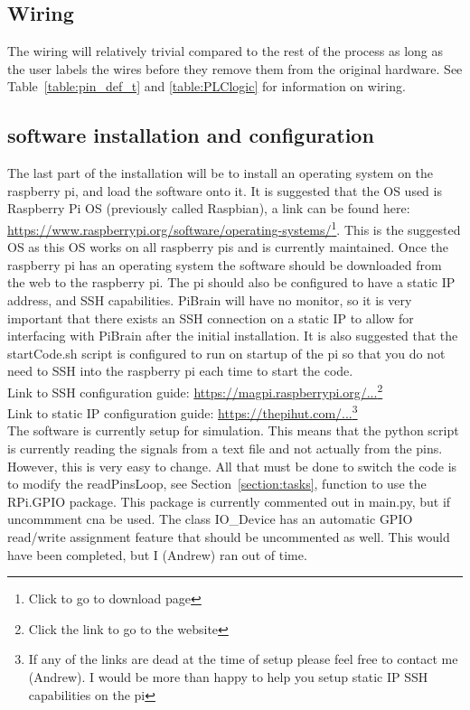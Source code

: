 \documentclass[titlepage]{article}
\begin{document}
\subsection{Wiring}
The wiring will relatively trivial compared to the rest of the process as long as the user labels the wires before they remove them from the original hardware. See Table~\ref{table:pin_def_t} and \ref{table:PLClogic} for information on wiring.\\

\subsection{software installation and configuration}
The last part of the installation will be to install an operating system on the raspberry pi, and load the software onto it. It is suggested that the OS used is Raspberry Pi OS (previously called Raspbian), a link can be found here: \href{https://www.raspberrypi.org/software/operating-systems/}{https://www.raspberrypi.org/software/operating-systems/}\footnote{Click to go to download page}. This is the suggested OS as this OS works on all raspberry pis and is currently maintained. Once the raspberry pi has an operating system the software should be downloaded from the web to the raspberry pi. The pi should also be configured to have a static IP address, and SSH capabilities. PiBrain will have no monitor, so it is very important that there exists an SSH connection on a static IP to allow for interfacing with PiBrain after the initial installation. It is also suggested that the startCode.sh script is configured to run on startup of the pi so that you do not need to SSH into the raspberry pi each time to start the code.\\

Link to SSH configuration guide: \href{https://magpi.raspberrypi.org/articles/ssh-remote-control-raspberry-pi}{https://magpi.raspberrypi.org/...}\footnote{Click the link to go to the website}\\

Link to static IP configuration guide: \href{https://thepihut.com/blogs/raspberry-pi-tutorials/how-to-give-your-raspberry-pi-a-static-ip-address-update}{https://thepihut.com/...}\footnote{If any of the links are dead at the time of setup please feel free to contact me (Andrew). I would be more than happy to help you setup static IP SSH capabilities on the pi}\\

The software is currently setup for simulation. This means that the python script is currently reading the signals from a text file and not actually from the pins. However, this is very easy to change. All that must be done to switch the code is to modify the readPinsLoop, see Section~\ref{section:tasks}, function to use the RPi.GPIO package. This package is currently commented out in main.py, but if uncommment cna be used. The class IO\_Device has an automatic GPIO read/write assignment feature that should be uncommented as well. This would have been completed, but I (Andrew) ran out of time.
\end{document}
